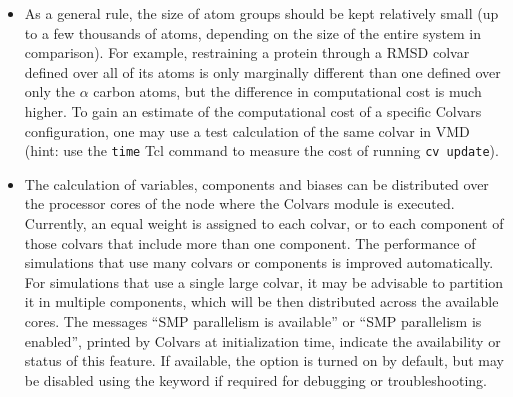 \begin{itemize}

\item As a general rule, the size of atom groups should be kept relatively small (up to a few thousands of atoms, depending on the size of the entire system in comparison).
  For example, restraining a protein through a RMSD colvar defined over all of its atoms is only marginally different than one defined over only the $\alpha$ carbon atoms, but the difference in computational cost is much higher.
To gain an estimate of the computational cost of a specific Colvars configuration, one may use a test calculation of the same colvar in VMD (hint: use the \texttt{time} Tcl command to measure the cost of running \texttt{cv update}).

\item The calculation of variables, components and biases can be distributed over the processor cores of the node where the Colvars module is executed.
  Currently, an equal weight is assigned to each colvar, or to each component of those colvars that include more than one component.
  The performance of simulations that use many colvars or components is improved automatically.
  For simulations that use a single large colvar, it may be advisable to partition it in multiple components, which will be then distributed across the available cores.
  The messages ``SMP parallelism is available'' or ``SMP parallelism is enabled'', printed by Colvars at initialization time, indicate the availability or status of this feature.
  If available, the option is turned on by default, but may be disabled using the keyword  if required for debugging or troubleshooting.


\end{itemize}


